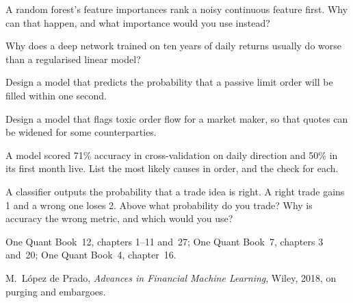 \begin{interviewq}\label{iq:iv:machine-learning:8}
A random forest's feature importances rank a noisy continuous feature first. Why can that happen, and what importance would
you use instead?
\end{interviewq}

\begin{interviewq}\label{iq:iv:machine-learning:9}
Why does a deep network trained on ten years of daily returns usually do worse than a regularised linear model?
\end{interviewq}

\begin{interviewq}\label{iq:iv:machine-learning:10}
Design a model that predicts the probability that a passive limit order will be filled within one second.
\end{interviewq}

\begin{interviewq}\label{iq:iv:machine-learning:11}
Design a model that flags toxic order flow for a market maker, so that quotes can be widened for some counterparties.
\end{interviewq}

\begin{interviewq}\label{iq:iv:machine-learning:12}
A model scored 71\% accuracy in cross-validation on daily direction and 50\% in its first month live. List the most likely
causes in order, and the check for each.
\end{interviewq}

\begin{interviewq}\label{iq:iv:machine-learning:13}
A classifier outputs the probability that a trade idea is right. A right trade gains 1 and a wrong one loses 2. Above what
probability do you trade? Why is accuracy the wrong metric, and which would you use?
\end{interviewq}

\begin{omsources}
\item One Quant Book~12, chapters 1--11 and~27; One Quant Book~7, chapters 3 and~20; One Quant Book~4, chapter~16.
\item M.~L\'opez de Prado, \emph{Advances in Financial Machine Learning}, Wiley, 2018, on purging and embargoes.
\end{omsources}
